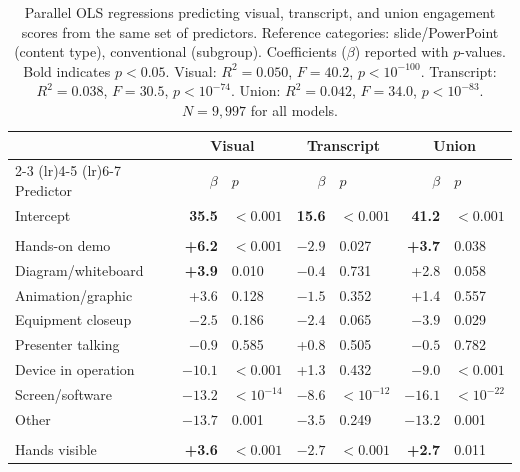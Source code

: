\documentclass[fleqn,10pt]{wlscirep}
\begin{document}
\begin{table}[ht]
    \centering
    \caption{Parallel OLS regressions predicting visual, transcript, and union engagement scores from the same set of predictors. Reference categories: slide/PowerPoint (content type), conventional (subgroup). Coefficients ($\beta$) reported with $p$-values. Bold indicates $p < 0.05$. Visual: $R^2 = 0.050$, $F = 40.2$, $p < 10^{-100}$. Transcript: $R^2 = 0.038$, $F = 30.5$, $p < 10^{-74}$. Union: $R^2 = 0.042$, $F = 34.0$, $p < 10^{-83}$. $N = 9{,}997$ for all models.}
    \label{tab:regression_dual}
    \begin{tabular}{lrlrlrl}
        \toprule
        & \multicolumn{2}{c}{Visual} & \multicolumn{2}{c}{Transcript} & \multicolumn{2}{c}{Union} \\
        \cmidrule(lr){2-3} \cmidrule(lr){4-5} \cmidrule(lr){6-7}
        Predictor & $\beta$ & $p$ & $\beta$ & $p$ & $\beta$ & $p$ \\
        \midrule
        Intercept & \textbf{35.5} & $<0.001$ & \textbf{15.6} & $<0.001$ & \textbf{41.2} & $<0.001$ \\
        \addlinespace
        \multicolumn{7}{l}{\textit{Content type (vs.\ slide/PowerPoint)}} \\
        \quad Hands-on demo & \textbf{+6.2} & $<0.001$ & \textbf{$-2.9$} & 0.027 & \textbf{+3.7} & 0.038 \\
        \quad Diagram/whiteboard & \textbf{+3.9} & 0.010 & $-0.4$ & 0.731 & +2.8 & 0.058 \\
        \quad Animation/graphic & +3.6 & 0.128 & $-1.5$ & 0.352 & +1.4 & 0.557 \\
        \quad Equipment closeup & $-2.5$ & 0.186 & $-2.4$ & 0.065 & \textbf{$-3.9$} & 0.029 \\
        \quad Presenter talking & $-0.9$ & 0.585 & +0.8 & 0.505 & $-0.5$ & 0.782 \\
        \quad Device in operation & \textbf{$-10.1$} & $<0.001$ & +1.3 & 0.432 & \textbf{$-9.0$} & $<0.001$ \\
        \quad Screen/software & \textbf{$-13.2$} & $<10^{-14}$ & \textbf{$-8.6$} & $<10^{-12}$ & \textbf{$-16.1$} & $<10^{-22}$ \\
        \quad Other & \textbf{$-13.7$} & 0.001 & $-3.5$ & 0.249 & \textbf{$-13.2$} & 0.001 \\
        \addlinespace
        \multicolumn{7}{l}{\textit{Segment features}} \\
        \quad Hands visible & \textbf{+3.6} & $<0.001$ & \textbf{$-2.7$} & $<0.001$ & \textbf{+2.7} & 0.011 \\

\end{tabular}
\end{table}
\end{document}
